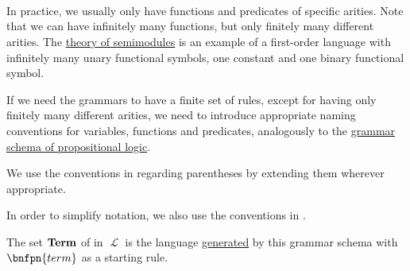 \begin{definition}
\begin{thmenum}
\begin{bnf*}
       \\
       \\
      \bnfmore                  {\hspace{3cm} \vdots} \\
       \\
      \bnfmore                  {\hspace{3cm} \vdots} \\
               { \bnfor} \\
       \\
       \\
    \end{bnf*}

    In practice, we usually only have functions and predicates of specific arities. Note that we can have infinitely many functions, but only finitely many different arities. The \hyperref[def:semimodule/theory]{theory of semimodules} is an example of a first-order language with infinitely many unary functional symbols, one constant and one binary functional symbol.

    If we need the grammars to have a finite set of rules, except for having only finitely many different arities, we need to introduce appropriate naming conventions for variables, functions and predicates, analogously to the \hyperref[def:propositional_syntax/grammar_schema]{grammar schema of propositional logic}.

    We use the conventions in  regarding parentheses by extending them wherever appropriate.

    In order to simplify notation, we also use the conventions in .

     The set \( \operatorname{\mathbf{Term}} \) of  in \( \mscrL \) is the language \hyperref[def:formal_grammar/language]{generated} by this grammar schema with \( \bnfpn{term} \) as a starting rule.


\end{thmenum}
\end{definition}
